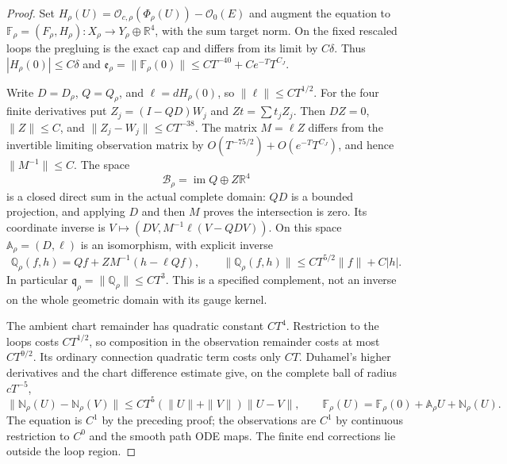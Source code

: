 \documentclass[11pt]{amsart}
\theoremstyle{definition}
\theoremstyle{remark}
\theoremstyle{plain}
\begin{document}
\begin{proof}
Set $H_\rho(U)=\mathcal O_{c,\rho}(\Phi_\rho(U))-\mathcal O_0(E)$
and augment the equation to
$\mathbb F_\rho=(F_\rho,H_\rho):X_\rho\to Y_\rho\oplus\mathbb R^4$,
with the sum target norm. On the fixed rescaled loops the pregluing
is the exact cap and differs from its limit by $C\delta$.
Thus $|H_\rho(0)|\leq C\delta$ and
$\mathfrak e_\rho=\|\mathbb F_\rho(0)\|
\leq CT^{-40}+Ce^{-T}T^{C_J}$.

Write $D=D_\rho$, $Q=Q_\rho$, and $\ell=dH_\rho(0)$,
so $\|\ell\|\leq CT^{1/2}$. For the four finite derivatives
put $Z_j=(I-QD)W_j$ and $Zt=\sum t_jZ_j$.
Then $DZ=0$, $\|Z\|\leq C$, and
$\|Z_j-W_j\|\leq CT^{-38}$. The matrix $M=\ell Z$
differs from the invertible limiting observation matrix by
$O(T^{-75/2})+O(e^{-T}T^{C_J})$, and hence $\|M^{-1}\|\leq C$.
The space
\[
                       \mathcal B_\rho=\operatorname{im}Q\oplus Z\mathbb R^4
\]
is a closed direct sum in the actual complete domain: $QD$
is a bounded projection, and applying $D$ and then $M$ proves
the intersection is zero. Its coordinate inverse is
$V\mapsto(DV,M^{-1}\ell(V-QDV))$.
On this space $\mathbb A_\rho=(D,\ell)$ is an isomorphism,
with explicit inverse
\begin{equation}\label{eq:gluing-augmented-inverse}
 \mathbb Q_\rho(f,h)=Qf+ZM^{-1}(h-\ell Qf),\qquad
 \|\mathbb Q_\rho(f,h)\|\leq CT^{5/2}\|f\|+C|h|.
\end{equation}
In particular $\mathfrak q_\rho=\|\mathbb Q_\rho\|\leq CT^3$.
This is a specified complement, not an inverse on the whole
geometric domain with its gauge kernel.

The ambient chart remainder has quadratic constant $CT^4$.
Restriction to the loops costs $CT^{1/2}$, so composition in
the observation remainder costs at most $CT^{9/2}$. Its
ordinary connection quadratic term costs only $CT$.
Duhamel's higher derivatives and the chart difference estimate give,
on the complete ball of radius $cT^{-5}$,
\[
 \|\mathbb N_\rho(U)-\mathbb N_\rho(V)\|
       \leq CT^5(\|U\|+\|V\|)\|U-V\|,
 \qquad
 \mathbb F_\rho(U)=\mathbb F_\rho(0)+\mathbb A_\rho U+\mathbb N_\rho(U).
\]
The equation is $C^1$ by the preceding proof; the observations
are $C^1$ by continuous restriction to $C^0$ and the smooth
path ODE maps. The finite end corrections lie outside the loop region.


\end{proof}
\end{document}
